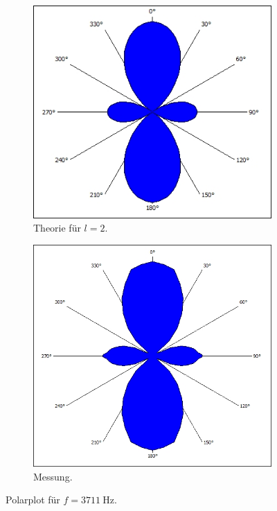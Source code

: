 \begin{figure}
    \centering
    \begin{subfigure}[b]{0.475\textwidth}
        \centering
        \begin{minipage}{\textwidth}\includegraphics[width=\textwidth]{ressources/l2.jpg}\end{minipage}
        \caption[]%
        {{\small Theorie für $l=2$.}}
        \label{fig:2_11a}
    \end{subfigure}
    \hfill
    \begin{subfigure}[b]{0.475\textwidth}
        \centering
        \begin{minipage}{\textwidth}\includegraphics[width=\textwidth]{messdaten/2_3_3711.jpg}\end{minipage}
        \caption[]%
        {{\small Messung.}}
        \label{fig:2_11b}
    \end{subfigure}
    \caption[]
    {Polarplot für $f=\SI{3711}{\hertz}$.}
    \label{fig:2_11}
\end{figure}
